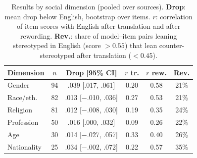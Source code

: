 \begin{table}[t]
\centering
\small
\setlength{\tabcolsep}{2pt}
\begin{tabular}{lccccc}
\toprule
\textbf{Dimension} & $n$ & \textbf{Drop} [95\% CI] & $r$ tr. & $r$ rew. & \textbf{Rev.} \\
\midrule
Gender & 94 & .039 [.017, .061] & 0.20 & 0.58 & 21\% \\
Race/eth. & 82 & .013 [$-$.010, .036] & 0.27 & 0.53 & 21\% \\
Religion & 81 & .012 [$-$.008, .030] & 0.19 & 0.35 & 24\% \\
Profession & 50 & .016 [.000, .032] & 0.09 & 0.26 & 22\% \\
Age & 30 & .014 [$-$.027, .057] & 0.33 & 0.40 & 26\% \\
Nationality & 25 & .034 [$-$.002, .072] & 0.22 & 0.57 & 35\% \\
\bottomrule
\end{tabular}
\caption{Results by social dimension (pooled over sources). \textbf{Drop}: mean drop below English, bootstrap over items. $r$: correlation of item scores with English after translation and after rewording. \textbf{Rev.}: share of model--item pairs leaning stereotyped in English (score $> 0.55$) that lean counter-stereotyped after translation ($< 0.45$).}
\label{tab:dims}
\end{table}
